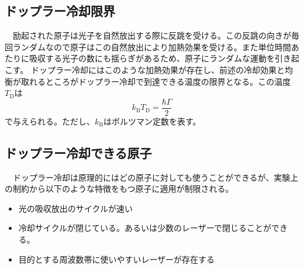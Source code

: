 \documentclass[uplatex,dvipdfmx,a4paper,report,papersize,11pt]{jsbook}
\begin{document}
\subsection{ドップラー冷却限界}
　励起された原子は光子を自然放出する際に反跳を受ける。この反跳の向きが毎回ランダムなので原子はこの自然放出により加熱効果を受ける。また単位時間あたりに吸収する光子の数にも揺らぎがあるため、原子にランダムな運動を引き起こす。
ドップラー冷却にはこのような加熱効果が存在し、前述の冷却効果と均衡が取れるところがドップラー冷却で到達できる温度の限界となる。この温度$T _ { \mathrm { D } }$は
\begin{equation}
  k _ { \mathrm { B } } T _ { \mathrm { D } } = \frac { \hbar \Gamma } { 2 }
\end{equation}
で与えられる。ただし、$k _ { \mathrm { B } }$はボルツマン定数を表す。
\subsection{ドップラー冷却できる原子}
　ドップラー冷却は原理的にはどの原子に対しても使うことができるが、実験上の制約から以下のような特徴をもつ原子に適用が制限される\cite{ノーベル賞と分光学}。
\begin{itemize}
  \item 光の吸収放出のサイクルが速い
  \item 冷却サイクルが閉じている。あるいは少数のレーザーで閉じることができる。
  \item 目的とする周波数帯に使いやすいレーザーが存在する
\end{itemize}

\newpage
\end{document}
